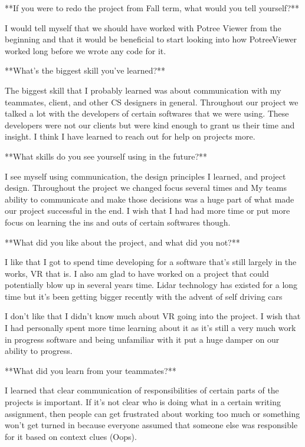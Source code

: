 \documentclass[draftclsnofoot,onecolumn]{IEEEtran}
\begin{document}
**If you were to redo the project from Fall term, what would you tell yourself?**

I would tell myself that we should have worked with Potree Viewer from the beginning and that it would be beneficial to start looking into how PotreeViewer worked long before we wrote any code for it.

**What's the biggest skill you've learned?**

The biggest skill that I probably learned was about communication with my teammates, client, and other CS designers in general. Throughout our project we talked a lot with the developers of certain softwares that we were using. These developers were not our clients but were kind enough to grant us their time and insight. I think I have learned to reach out for help on projects more.

**What skills do you see yourself using in the future?**

I see myself using communication, the design principles I learned, and project design. Throughout the project we changed focus several times and My teams ability to communicate and make those decisions was a huge part of what made our project successful in the end. I wish that I had had more time or put more focus on learning the ins and outs of certain softwares though.

**What did you like about the project, and what did you not?**

I like that I got to spend time developing for a software that's still largely in the works, VR that is. I also am glad to have worked on a project that could potentially blow up in several years time. Lidar technology has existed for a long time but it's been getting bigger recently with the advent of self driving cars 

I don't like that I didn't know much about VR going into the project. I wish that I had personally spent more time learning about it as it's still a very much work in progress software and being unfamiliar with it put a huge damper on our ability to progress.

**What did you learn from your teammates?**

I learned that clear communication of responsibilities of certain parts of the projects is important. If it's not clear who is doing what in a certain writing assignment, then people can get frustrated about working too much or something won't get turned in because everyone assumed that someone else was responsible for it based on context clues (Oops).
\end{document}
